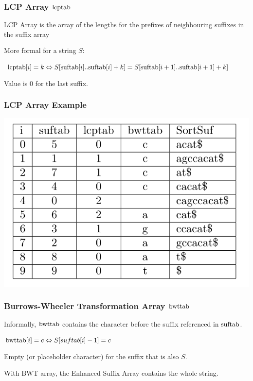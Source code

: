 \documentclass[compress,handout]{beamer} %
\begin{document}
\begin{frame}
	\frametitle{LCP Array $\hbox{lcptab}$}
	LCP Array is the array of the lengths for the prefixes of
	neighbouring suffixes in the suffix array

	More formal for a string $S$:

	$\hbox{lcptab}[i]=k \Leftrightarrow S[\hbox{suftab}[i]..\hbox{suftab}[i]+k]=S[\hbox{suftab}[i+1]..\hbox{suftab}[i+1]+k]$

	Value is $0$ for the last suffix.
\end{frame}

\begin{frame}
	\frametitle{LCP Array Example}
	\includegraphics[width=\textwidth, height=\textheight, keepaspectratio=true]{esa_lcp_search}
\end{frame}

\begin{frame}
	\frametitle{Burrows-Wheeler Transformation Array $\hbox{bwttab}$}
	Informally, $\hbox{bwttab}$ contains the character before the
	suffix referenced in $\hbox{suftab}$.

	$\hbox{bwttab}[i]=c \Leftrightarrow S[suftab[i]-1]=c$

	Empty (or placeholder character) for the suffix that is also $S$.

	With BWT array, the Enhanced Suffix Array contains the whole
	string.
\end{frame}
\end{document}
